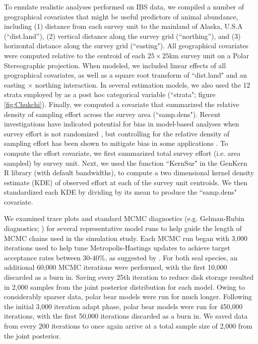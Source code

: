 \documentclass[]{rsos}%
\begin{document}
{To emulate realistic analyses performed on IBS data, we compiled a number of geographical covariates that might be useful predictors of animal abundance, including (1) distance from each survey unit to the mainland of Alaska, U.S.A (``dist.land''), (2) vertical distance along the survey grid (``northing''), and (3) horizontal distance along the survey grid (``easting"). All geographical covariates were computed relative to the centroid of each $25\times25$km survey unit on a Polar Stereographic projection. When modeled, we included linear effects of all geographical covariates, as well as a square root transform of ``dist.land" and an easting $\times$ northing interaction.  In several estimation models, we also used the 12 strata employed by \cite{Bengtson2005} as a post hoc categorical variable (``strata"; figure \ref{fig:Chukchi}). Finally, we computed a covariate that summarized the relative density of sampling effort across the survey area (``samp.dens").  Recent investigations have indicated potential for bias in model-based analyses when survey effort is not randomized \cite{DiggleEtAl2010}, but controlling for the relative density of sampling effort has been shown to mitigate bias in some applications \cite{PatiEtAl2011}.  To compute the effort covariate, we first summarized total survey effort (i.e. area sampled) by survey unit.  Next, we used the function ``KernSur" in the GenKern R library (with default bandwidths), to compute a two dimensional kernel density estimate (KDE) of observed effort at each of the survey unit centroids.  We then standardized each KDE by dividing by its mean to produce the ``samp.dens" covariate.

We examined trace plots and standard MCMC diagnostics (e.g. Gelman-Rubin diagnostics; \cite{Gelman2004}) for several representative model runs to help guide the length of MCMC chains used in the simulation study.  Each MCMC run began with 3,000 iterations used to help tune Metropolis-Hastings updates to achieve target acceptance rates between 30-40\%, as suggested by \cite{Gelman2004}.  For both seal species, an additional 60,000 MCMC iterations were performed, with the first 10,000 discarded as a burn in.  Saving every 25th iteration to reduce disk storage resulted in 2,000 samples from the joint posterior distribution for each model.  Owing to considerably sparser data, polar bear models were run for much longer.  Following the initial 3,000 iteration adapt phase, polar bear models were run for 450,000 iterations, with the first 50,000 iterations discarded as a burn in.  We saved data from every 200 iterations to once again arrive at a total sample size of 2,000 from the joint posterior.

}
\end{document}
